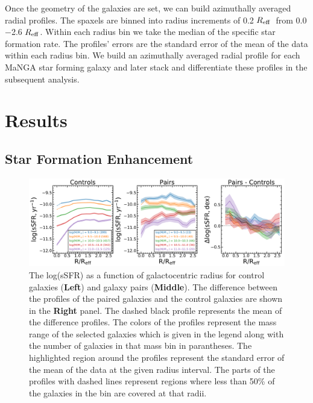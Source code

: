 \documentclass[iop,revtex4,twocolumn,apj,numberedappendix,appendixfloats]{emulateapj}
\newcommand{\reff}{$R_{\rm eff}$}
\begin{document}
Once the geometry of the galaxies are set, we can build azimuthally averaged radial profiles. The spaxels are binned into radius increments of 0.2 \reff\ from 0.0$-$2.6 \reff. Within each radius bin we take the median of the specific star formation rate. The profiles' errors are the standard error of the mean of the data within each radius bin. We build an azimuthally averaged radial profile for each MaNGA star forming galaxy and later stack and differentiate these profiles in the subsequent analysis. 

\section{Results}\label{sec:results}

\subsection{Star Formation Enhancement}

\begin{figure}
\centering
\includegraphics[width=\linewidth]{fig/ssfr_comb.pdf}
\caption[]{The log(sSFR) as a function of galactocentric radius for control galaxies (\textbf{Left}) and galaxy pairs (\textbf{Middle}). The difference between the profiles of the paired galaxies and the control galaxies are shown in the \textbf{Right} panel. The dashed black profile represents the mean of the difference profiles. The colors of the profiles represent the mass range of the selected galaxies which is given in the legend along with the number of galaxies in that mass bin in parantheses. The highlighted region around the profiles represent the standard error of the mean of the data at the given radius interval. The parts of the profiles with dashed lines represent regions where less than 50\% of the galaxies in the bin are covered at that radii. }
\label{fig:ssfr_prof}
\end{figure}
\end{document}
